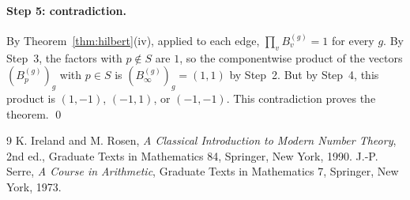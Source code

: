 \documentclass[11pt]{article}
\begin{document}
\paragraph{Step 5: contradiction.} By Theorem~\ref{thm:hilbert}(iv), applied to each edge, $\prod_vB^{(g)}_v=1$ for every $g$. By Step~3, the factors with $p\notin S$ are $1$, so the componentwise product of the vectors $(B^{(g)}_p)_g$ with $p\in S$ is $(B^{(g)}_\infty)_g=(1,1)$ by Step~2. But by Step~4, this product is $(1,-1)$, $(-1,1)$, or $(-1,-1)$. This contradiction proves the theorem.
\qed

\begin{thebibliography}{9}
 K. Ireland and M. Rosen, \emph{A Classical Introduction to Modern Number Theory}, 2nd ed., Graduate Texts in Mathematics 84, Springer, New York, 1990.
 J.-P. Serre, \emph{A Course in Arithmetic}, Graduate Texts in Mathematics 7, Springer, New York, 1973.
\end{thebibliography}
\end{document}
